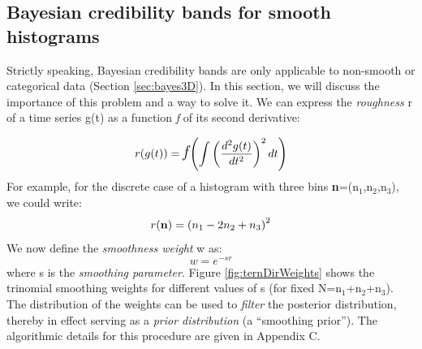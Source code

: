 \documentclass{article}
\begin{document}
\clearpage

\subsection{Bayesian credibility bands for smooth histograms} 
\label{sec:bayesSmooth}

Strictly speaking,  Bayesian credibility bands are  only applicable to
non-smooth or  categorical data (Section  \ref{sec:bayes3D}).  In this
section, we will  discuss the importance of this problem  and a way to
solve it.  We can express the  {\it roughness} r of a time series g(t)
as a function {\it f} of its second derivative:

\begin{equation}
  \label{eq:contRoughness}
  r(g(t))  = \mbox{\Large{\it f}} \left(  \int\left(\frac{d^2 g(t)}{dt^2}\right)^2dt
  \right)
\end{equation}
For example, for the discrete case of a histogram with three bins {\bf
n}=(n$_1$,n$_2$,n$_3$), we could write:
\begin{equation}
  \label{eq:discSmoothness}
  r({\bf n}) = \left(n_1-2n_2+n_3\right)^2
\end{equation}
We now define the {\it smoothness weight} w as:
\begin{equation}
  \label{eq:smoothness}
  w = e^{-sr}
\end{equation}
where    s    is    the    {\it    smoothing    parameter}.     Figure
\ref{fig:ternDirWeights}  shows the  trinomial  smoothing weights  for
different   values  of   s  (for   fixed   N=n$_1$+n$_2$+n$_3$).   The
distribution of the weights can  be used to {\it filter} the posterior
distribution, thereby in effect  serving as a {\it prior distribution}
(a ``smoothing  prior''). The  algorithmic details for  this procedure
are given in Appendix C.
\end{document}
